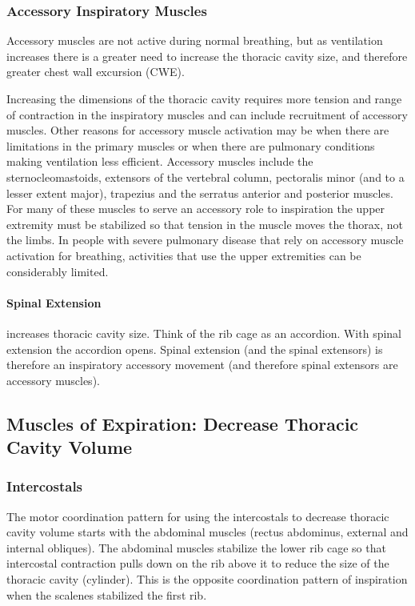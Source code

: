 \subsubsection{Accessory Inspiratory Muscles}
Accessory muscles are not active during normal breathing, but as ventilation increases there is a greater need to increase the thoracic cavity size, and therefore greater chest wall excursion (CWE).

Increasing the dimensions of the thoracic cavity requires more tension and range of contraction in the inspiratory muscles and can include recruitment of accessory muscles. Other reasons for accessory muscle activation may be when there are limitations in the primary muscles or when there are pulmonary conditions making ventilation less efficient. Accessory muscles include the sternocleomastoids, extensors of the vertebral column, pectoralis minor (and to a lesser extent major), trapezius and the serratus anterior and posterior muscles. For many of these muscles to serve an accessory role to inspiration the upper extremity must be stabilized so that tension in the muscle moves the thorax, not the limbs. In people with severe pulmonary disease that rely on accessory muscle activation for breathing, activities that use the upper extremities can be considerably limited.

\paragraph{Spinal Extension} increases thoracic cavity size. Think of the rib cage as an accordion. With spinal extension the accordion opens. Spinal extension (and the spinal extensors) is therefore an inspiratory accessory movement (and therefore spinal extensors are accessory muscles).


\subsection{Muscles of Expiration: Decrease Thoracic Cavity Volume}

\subsubsection{Intercostals}

The motor coordination pattern for using the intercostals to decrease thoracic cavity volume starts with the abdominal muscles (rectus abdominus, external and internal obliques). The abdominal muscles stabilize the lower rib cage so that intercostal contraction pulls down on the rib above it to reduce the size of the thoracic cavity (cylinder). This is the opposite coordination pattern of inspiration when the scalenes stabilized the first rib. 

